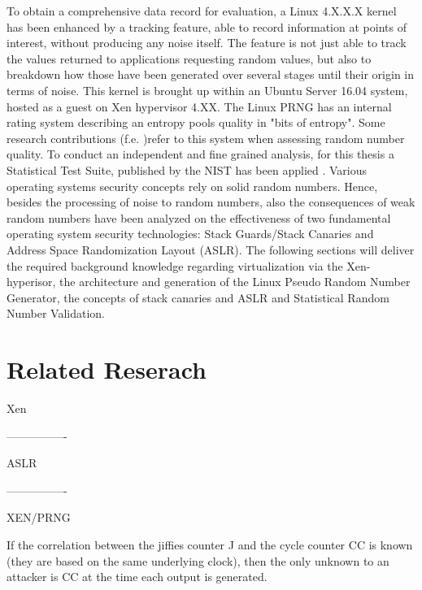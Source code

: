 To obtain a comprehensive data record for evaluation, a Linux 4.X.X.X kernel has been enhanced by a tracking feature, able to record information at points of interest, without producing any noise itself. The feature is not just able to track the values returned to applications requesting random values, but also to breakdown how those have been generated over several stages until their origin in terms of noise. This kernel is brought up within an Ubuntu Server 16.04 system, hosted as a guest on Xen hypervisor 4.XX. The Linux PRNG has an internal rating system describing an entropy pools quality in "bits of entropy". Some research contributions (f.e. \cite{lacharme2012linux})refer to this system when assessing random number quality. To conduct an independent and fine grained analysis, for this thesis a Statistical Test Suite, published by the NIST has been applied \cite{paul2016nist}. Various operating systems security concepts rely on solid random numbers. Hence, besides the processing of noise to random numbers, also the consequences of weak random numbers have been analyzed on the effectiveness of two fundamental operating system security technologies: Stack Guards/Stack Canaries and Address Space Randomization Layout (ASLR).
The following sections will deliver the required background knowledge regarding virtualization via the Xen-hyperisor, the architecture and generation of the Linux Pseudo Random Number Generator, the concepts of stack canaries and ASLR and Statistical Random Number Validation. 



\section{Related Reserach}

Xen

----------------

ASLR

----------------

XEN/PRNG

If the correlation between
the jiffies counter J and the cycle counter CC is known
(they are based on the same underlying clock), then the
only unknown to an attacker is CC at the time each output
is generated. \cite{everspaugh2014not}












   





